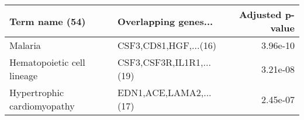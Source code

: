 \begin{tabular}{llr}
\toprule
             Term name (54) &     Overlapping genes... &  Adjusted p-value \\
\midrule
                    Malaria &    CSF3,CD81,HGF,...(16) &          3.96e-10 \\
 Hematopoietic cell lineage & CSF3,CSF3R,IL1R1,...(19) &          3.21e-08 \\
Hypertrophic cardiomyopathy &   EDN1,ACE,LAMA2,...(17) &          2.45e-07 \\
\bottomrule
\end{tabular}
